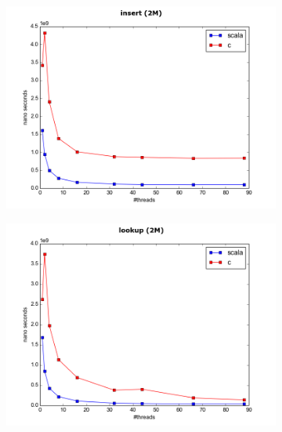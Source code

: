 \documentclass[conference]{IEEEtran}
\begin{document}
	\begin{figure}
		\begin{subfigure}{.5\textwidth}
			\includegraphics[width=0.45\paperwidth]{vs_scala/insert_2M.png}
			\label{fig:c_vs_scala_insert}			
		\end{subfigure}
		\begin{subfigure}{.5\textwidth}
			\includegraphics[width=0.45\paperwidth]{vs_scala/lookup_2M.png}	
			\label{fig:c_vs_scala_lookup}
		\end{subfigure}
		\begin{subfigure}{.5\textwidth}

\end{subfigure}
\end{figure}
\end{document}
